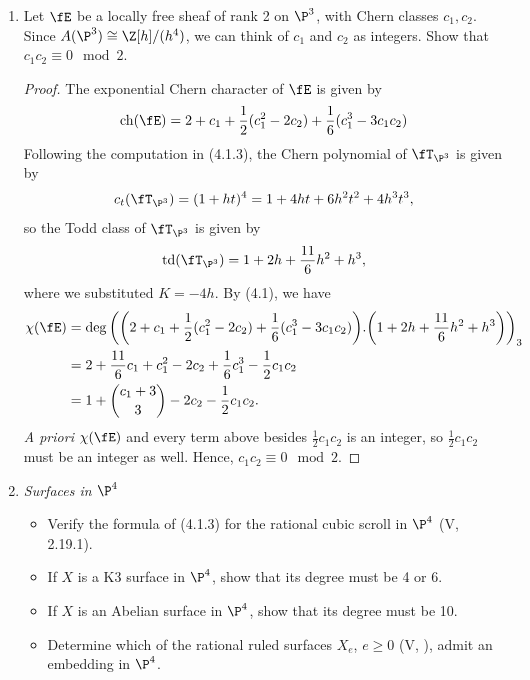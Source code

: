 \documentclass[a4paper]{article}
\begin{document}
\begin{enumerate} [label=\textbf{\arabic*.}, leftmargin=0em]
      \item Let $\fE$ be a locally free sheaf of rank 2 on $\P^3$, with Chern classes $c_1, c_2$.
      Since $A(\P^3) \cong \Z[h]/(h^4)$, we can think of $c_1$ and $c_2$ as integers.
      Show that $c_1 c_2 \equiv 0 \mod{2}$.

      \begin{proof}
           The exponential Chern character of $\fE$ is given by 
           \begin{equation*}
            \chern(\fE) = 2 + c_1 + \frac{1}{2}(c_1^2 - 2c_2) + \frac{1}{6}(c_1^3 - 3c_1c_2)
           \end{equation*}
           Following the computation in (4.1.3), the Chern polynomial of $\fT_{\P^3}$ is given by
           \begin{equation*}
            c_t(\fT_{\P^3}) = (1 + ht)^4 = 1 + 4ht + 6h^2t^2 + 4h^3t^3,
           \end{equation*}
           so the Todd class of $\fT_{\P^3}$ is given by
           \begin{equation*}
            \todd(\fT_{\P^3}) = 1 + 2h + \frac{11}{6}h^2 + h^3,
           \end{equation*}
           where we substituted $K = -4h$.
           By (4.1), we have
           \begin{align*}
            \chi(\fE) & = \deg\bigg( \bigg( 2 + c_1 + \frac{1}{2}(c_1^2 - 2c_2) + \frac{1}{6}(c_1^3 - 3c_1c_2) \bigg).\bigg(1 + 2h + \frac{11}{6}h^2 + h^3\bigg)\bigg)_3 \\
            & = 2 + \frac{11}{6}c_1 + c_1^2 - 2c_2 + \frac{1}{6}c_1^3 - \frac{1}{2}c_1c_2 \\
            & = 1 + \binom{c_1 + 3}{3} - 2c_2 - \frac{1}{2}c_1c_2.
           \end{align*}
           \textit{A priori} $\chi(\fE)$ and every term above besides $\frac{1}{2}c_1c_2$ is an integer, so $\frac{1}{2}c_1c_2$ must be an integer as well.
           Hence, $c_1c_2 \equiv 0 \mod{2}$.
      \end{proof}

      \item \textit{Surfaces in $\P^4$}
      \begin{itemize}
            \item[(a)] Verify the formula of (4.1.3) for the rational cubic scroll in $\P^4$ (V, 2.19.1).
            \item[(b)] If $X$ is a K3 surface in $\P^4$, show that its degree must be 4 or 6.
            \item[(c)] If $X$ is an Abelian surface in $\P^4$, show that its degree must be 10.
            \item[(d)] Determine which of the rational ruled surfaces $X_e$, $e \geq 0$ (V, ), admit an embedding in $\P^4$.
      \end{itemize}


\end{enumerate}
\end{document}
